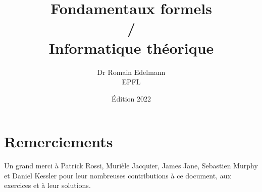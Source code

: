 \documentclass[12pt,french,a4paper]{memoir}
\begin{document}
\title{Fondamentaux formels\\/\\Informatique théorique}
\author{Dr Romain Edelmann\\EPFL}
\date{Édition 2022}
\maketitle

\frontmatter

\chapter*{Remerciements}

Un grand merci à Patrick Rossi, Murièle Jacquier, James Jane, Sebastien Murphy et Daniel Kessler pour leur nombreuses contributions à ce document, aux exercices et à leur solutions.

\newpage

\tableofcontents

\mainmatter
















\end{document}
